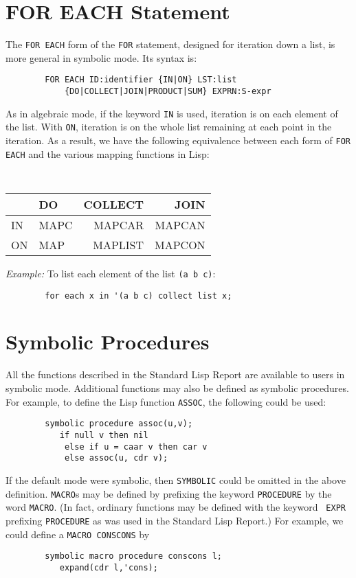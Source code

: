 \section{FOR EACH Statement} 

The {\tt FOR EACH} form of the {\tt FOR} statement, designed for iteration
down a list, is more general in symbolic mode.  Its syntax is:

\begin{verbatim}
        FOR EACH ID:identifier {IN|ON} LST:list
            {DO|COLLECT|JOIN|PRODUCT|SUM} EXPRN:S-expr
\end{verbatim}

As in algebraic mode, if the keyword {\tt IN} is used, iteration is on
each element of the list.  With {\tt ON}, iteration is on the whole list
remaining at each point in the iteration.  As a result, we have the
following equivalence between each form of {\tt FOR EACH} and the various
mapping functions in Lisp:
\begin{center}
{\tt
\begin{tabular}{|l|lr r|} \hline
& DO & COLLECT & JOIN \\ \hline
        IN &   MAPC & MAPCAR & MAPCAN \\
        ON &   MAP &  MAPLIST & MAPCON \\ \hline
\end{tabular}}
\end{center}
{\it Example:} To list each element of the list {\tt (a b c)}:
\begin{verbatim}
        for each x in '(a b c) collect list x;
\end{verbatim}

\section{Symbolic Procedures} 

All the functions described in the Standard Lisp Report are available to
users in symbolic mode. Additional functions may also be defined as
symbolic procedures. For example, to define the Lisp function {\tt ASSOC},
the following could be used:
\begin{verbatim}
        symbolic procedure assoc(u,v);
           if null v then nil
            else if u = caar v then car v
            else assoc(u, cdr v);
\end{verbatim}
If the default mode were symbolic, then {\tt SYMBOLIC} could be omitted in
the above definition. {\tt MACRO}s may be defined by
prefixing the keyword {\tt PROCEDURE} by the word {\tt MACRO}.
(In fact, ordinary functions may be defined with the keyword {\tt
EXPR} prefixing {\tt PROCEDURE} as was used in the Standard Lisp Report.)
For example, we could define a {\tt MACRO CONSCONS} by
\begin{verbatim}
        symbolic macro procedure conscons l;
           expand(cdr l,'cons);
\end{verbatim}

